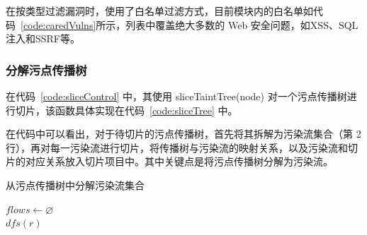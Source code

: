 \begin{minipage}[!htbp]{0.9\textwidth}
    
\end{minipage}

在按类型过滤漏洞时，使用了白名单过滤方式，目前模块内的白名单如代码~\ref{code:caredVulns}所示，列表中覆盖绝大多数的 Web 安全问题，如XSS、SQL注入和SSRF等。

\subsubsection{分解污点传播树}

在代码~\ref{code:sliceControl} 中，其使用 sliceTaintTree(node) 对一个污点传播树进行切片，该函数具体实现在代码~\ref{code:sliceTree} 中。

\begin{minipage}{0.9\textwidth}
    
\end{minipage}
 
 在代码中可以看出，对于待切片的污点传播树，首先将其拆解为污染流集合（第 2 行），再对每一污染流进行切片，将传播树与污染流的映射关系，以及污染流和切片的对应关系放入切片项目中。其中关键点是将污点传播树分解为污染流。
 
 \begin{algorithm}[!htb]\footnotesize
     \caption{从污点传播树中分解污染流集合}
     \label{alg:getTaintFlows}
     $flows \leftarrow \varnothing$\\
     $dfs(r)$\\
 \end{algorithm}

